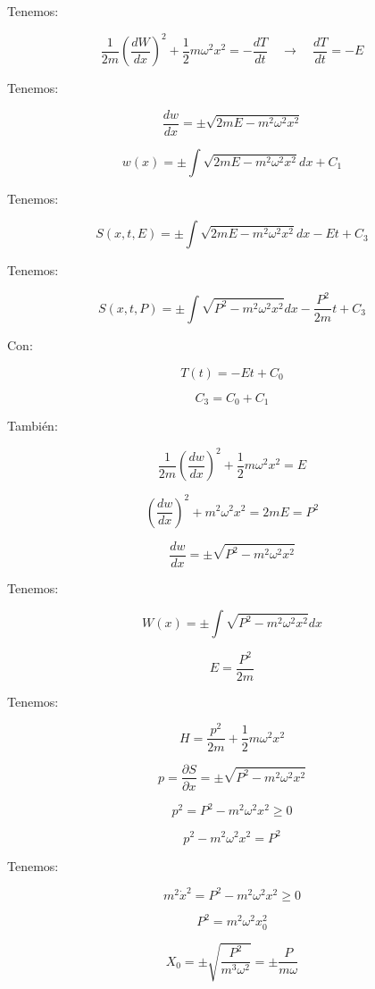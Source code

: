 \documentclass{article}
\begin{document}
Tenemos:


\[ \frac{1}{2m} \left(  \frac{ dW  }{dx} \right)^{2} + \frac{1}{2} m\omega^{2}x^{2} = - \frac{dT}{dt} \quad \to \quad \frac{dT}{dt} = -E  \]

Tenemos:


\[ \frac{dw}{dx} = \pm \sqrt{ 2mE - m^{2}\omega^{2}x^{2}  } \]


\[ w(x) = \pm \int\limits \sqrt{  2mE-m^{2}\omega^{2}x^{2}  } dx + C_{1} \]


Tenemos:


\[ S(x,t,E) = \pm \int\limits \sqrt{  2mE-m^{2}\omega^{2}x^{2}   } dx -Et +C_{3} \]


Tenemos:


\[ S(x,t,P) = \pm \int\limits \sqrt{ P^{2} - m^{2}\omega^{2}x^{2}  } dx - \frac{P^{2}}{2m}t +C_{3} \]

Con:


\[ T(t) = -Et +C_{0} \]

\[   C_{3} = C_{0} +C_{1}  \]


También:


\[  \frac{1}{2m} \left(   \frac{dw}{dx}  \right)^{2} + \frac{1}{2} m\omega^{2}x^{2} =E    \]



\[ \left(  \frac{dw}{dx} \right)^{2} + m^{2}\omega^{2}x^{2} =2mE=P^{2}  \]

\[ \frac{dw}{dx} = \pm \sqrt{ P^{2} -m^{2}\omega^{2}x^{2}  } \]

Tenemos:


\[ W(x) = \pm \int\limits \sqrt{ P^{2}-m^{2}\omega^{2}x^{2}  }dx \]

\[ E = \frac{P^{2}}{2m} \]

Tenemos:


\[ H = \frac{p^{2}}{2m} + \frac{1}{2}m\omega^{2}x^{2}  \]


\[  p = \frac{\partial S}{\partial x} = \pm \sqrt{ P^{2}-m^{2}\omega^{2}x^{2}  } \]


\[ p^{2} = P^{2}-m^{2}\omega^{2}x^{2}\geq 0 \]

\[p^{2} - m^{2}\omega^{2}x^{2}=P^{2} \]

Tenemos:


\[ m^{2}\dot{x}^{2} = P^{2} -m^{2}\omega^{2}x^{2}\geq 0  \]


\[ P^{2} = m^{2}\omega^{2}x_{0}^{2}  \]

\[ X_{0} = \pm \sqrt{ \frac{P^{2}}{m^{3}\omega^{2}}  } = \pm \frac{P}{m\omega} \]
\end{document}
